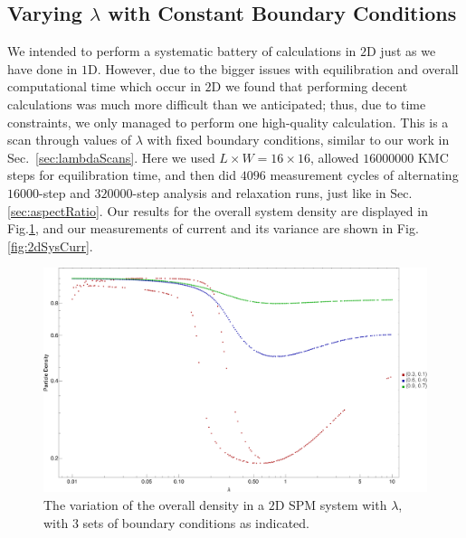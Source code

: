 \subsection{Varying $\lambda$ with Constant Boundary Conditions} \label{sec:2dLambdaScans}
We intended to perform a systematic battery of calculations in $2$D just as we have done in $1$D.
However, due to the bigger issues with equilibration and overall computational time which occur in $2$D we found that performing decent calculations was much more difficult than we anticipated; thus, due to time constraints, we only managed to perform one high-quality calculation.
This is a scan through values of $\lambda$ with fixed boundary conditions, similar to our work
in Sec.~\ref{sec:lambdaScans}. Here we used $L \times W = 16 \times 16$, allowed $16000000$ KMC
steps for equilibration time, and then did $4096$ measurement cycles of alternating $16000$-step
and $320000$-step analysis and relaxation runs, just like in Sec.\ref{sec:aspectRatio}.
Our results for the overall system density are displayed in Fig.\ref{fig:2dSysDens}, and
our measurements of current and its variance are shown in Fig.\ref{fig:2dSysCurr}.
\begin{figure} \caption[The variation of the overall density in a $2$D SPM system with 
$\lambda$.]{The variation of the overall density in a $2$D SPM system with $\lambda$, with
$3$ sets of boundary conditions as indicated.} 
\label{fig:2dSysDens}
\begin{center}
\includegraphics[width=0.95\textheight, angle=270]{numerics/images/2d/2dDensity}
\end{center}
\end{figure}
